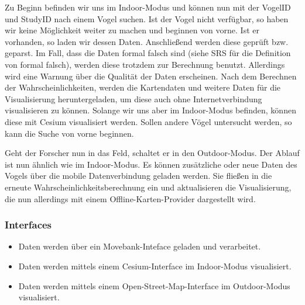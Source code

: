 \documentclass[12pt]{article} %
\begin{document}
Zu Beginn befinden wir uns im Indoor-Modus und können nun mit der VogelID und StudyID nach einem Vogel suchen. Ist der Vogel nicht verfügbar, so haben wir keine Möglichkeit weiter zu machen und beginnen von vorne. Ist er vorhanden, so laden wir dessen Daten. Anschließend werden diese geprüft bzw. geparst. Im Fall, dass die Daten formal falsch sind (siehe SRS für die Definition von formal falsch), werden diese trotzdem zur Berechnung benutzt. Allerdings wird eine Warnung über die Qualität der Daten erscheinen. Nach dem Berechnen der Wahrscheinlichkeiten, werden die Kartendaten und weitere Daten für die Visualisierung heruntergeladen, um diese auch ohne Internetverbindung visualisieren zu können. Solange wir uns aber im Indoor-Modus befinden, können diese mit Cesium visualisiert werden. Sollen andere Vögel untersucht werden, so kann die Suche von vorne beginnen.

Geht der Forscher nun in das Feld, schaltet er in den Outdoor-Modus. Der Ablauf ist nun ähnlich wie im Indoor-Modus. Es können zusätzliche oder neue Daten des Vogels über die mobile Datenverbindung geladen werden. Sie fließen in die erneute Wahrscheinlichkeitsberechnung ein und aktualisieren die Visualisierung, die nun allerdings mit einem Offline-Karten-Provider dargestellt wird. 

\subsubsection{Interfaces}
\label{sec:interfaces}
\begin{itemize}
	\item Daten werden über ein Movebank-Inteface geladen und verarbeitet. 
	\item Daten werden mittels einem Cesium-Interface im Indoor-Modus visualisiert.
	\item Daten werden mittels einem Open-Street-Map-Interface im Outdoor-Modus visualisiert.
\end{itemize}

\end{document}
